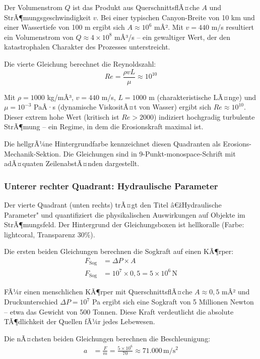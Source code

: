 Der Volumenstrom $Q$ ist das Produkt aus QuerschnittsflÃ¤che $A$ und StrÃ¶mungsgeschwindigkeit $v$. Bei einer typischen Canyon-Breite von 10 km und einer Wassertiefe von 100 m ergibt sich $A \approx 10^6$ mÂ². Mit $v = 440$ m/s resultiert ein Volumenstrom von $Q \approx 4 \times 10^8$ mÂ³/s -- ein gewaltiger Wert, der den katastrophalen Charakter des Prozesses unterstreicht.

Die vierte Gleichung berechnet die Reynoldszahl:
\begin{equation*}
Re = \frac{\rho v L}{\mu} \approx 10^{10}
\end{equation*}

Mit $\rho = 1000$ kg/mÂ³, $v = 440$ m/s, $L = 1000$ m (charakteristische LÃ¤nge) und $\mu = 10^{-3}$ PaÂ·s (dynamische ViskositÃ¤t von Wasser) ergibt sich $Re \approx 10^{10}$. Dieser extrem hohe Wert (kritisch ist $Re > 2000$) indiziert hochgradig turbulente StrÃ¶mung -- ein Regime, in dem die Erosionskraft maximal ist.

Die hellgrÃ¼ne Hintergrundfarbe kennzeichnet diesen Quadranten als Erosions-Mechanik-Sektion. Die Gleichungen sind in 9-Punkt-monospace-Schrift mit adÃ¤quaten ZeilenabstÃ¤nden dargestellt.

\subsubsection*{Unterer rechter Quadrant: Hydraulische Parameter}

Der vierte Quadrant (unten rechts) trÃ¤gt den Titel â€žHydraulische Parameter" und quantifiziert die physikalischen Auswirkungen auf Objekte im StrÃ¶mungsfeld. Der Hintergrund der Gleichungsboxen ist hellkoralle (Farbe: lightcoral, Transparenz 30\%).

Die ersten beiden Gleichungen berechnen die Sogkraft auf einen KÃ¶rper:
\begin{align*}
F_{\mathrm{Sog}} &= \Delta P \times A \\
F_{\mathrm{Sog}} &= 10^7 \times 0{,}5 = 5 \times 10^6 \, \mathrm{N}
\end{align*}

FÃ¼r einen menschlichen KÃ¶rper mit QuerschnittsflÃ¤che $A \approx 0{,}5$ mÂ² und Druckunterschied $\Delta P = 10^7$ Pa ergibt sich eine Sogkraft von 5 Millionen Newton -- etwa das Gewicht von 500 Tonnen. Diese Kraft verdeutlicht die absolute TÃ¶dlichkeit der Quellen fÃ¼r jedes Lebewesen.

Die nÃ¤chsten beiden Gleichungen berechnen die Beschleunigung:
\begin{align*}
a &= \frac{F}{m} = \frac{5 \times 10^6}{70} \approx 71{.}000 \, \mathrm{m/s^2}
\end{align*}

